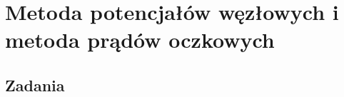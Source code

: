 \chapter{Metoda potencjałów węzłowych i metoda prądów oczkowych}

\section{Zadania}


























